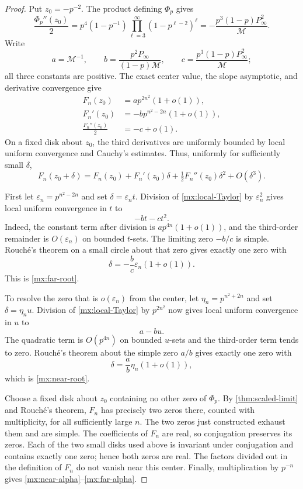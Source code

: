 \documentclass[11pt]{article}
\numberwithin{equation}{section}
\theoremstyle{definition}
\theoremstyle{remark}
\begin{document}
\begin{proof}
Put $z_0=-p^{-2}$.  The product defining $\Phi_p$ gives
\begin{equation}\label{mx:second-limit-derivative}
 \frac{\Phi_p''(z_0)}2
 =p^4(1-p^{-1})
 \prod_{\ell=3}^{\infty}(1-p^{\ell-2})^\ell
 =-\frac{p^3(1-p)P_\infty^2}{\mathcal M}.
\end{equation}
Write
\[
 a=\mathcal M^{-1},\qquad
 b=\frac{p^2P_\infty}{(1-p)\mathcal M},\qquad
 c=\frac{p^3(1-p)P_\infty^2}{\mathcal M};
\]
all three constants are positive.
The exact center value, the slope asymptotic, and derivative
convergence give
\begin{align*}
 F_n(z_0)&=a p^{2n^2}(1+o(1)),\\
 F_n'(z_0)&=-b p^{n^2-2n}(1+o(1)),\\
 \frac{F_n''(z_0)}2&=-c+o(1).
\end{align*}
On a fixed disk about $z_0$, the third derivatives are uniformly
bounded by local uniform convergence and Cauchy's estimates.
Thus, uniformly for sufficiently small $\delta$,
\begin{equation}\label{mx:local-Taylor}
 F_n(z_0+\delta)
 =F_n(z_0)+F_n'(z_0)\delta
 +\tfrac12F_n''(z_0)\delta^2+O(\delta^3).
\end{equation}

First let $\varepsilon_n=p^{n^2-2n}$ and set
$\delta=\varepsilon_nt$.
Division of \eqref{mx:local-Taylor} by $\varepsilon_n^2$ gives
local uniform convergence in $t$ to
\[
 -bt-ct^2.
\]
Indeed, the constant term after division is
$a p^{4n}(1+o(1))$, and the third-order remainder is
$O(\varepsilon_n)$ on bounded $t$-sets.
The limiting zero $-b/c$ is simple.
Rouch\'e's theorem on a small circle about that zero gives exactly
one zero with
\[
 \delta=-\frac bc\varepsilon_n(1+o(1)).
\]
This is \eqref{mx:far-root}.

To resolve the zero that is $o(\varepsilon_n)$ from the center,
let $\eta_n=p^{n^2+2n}$ and set $\delta=\eta_nu$.
Division of \eqref{mx:local-Taylor} by $p^{2n^2}$ now gives
local uniform convergence in $u$ to
\[
 a-bu.
\]
The quadratic term is $O(p^{4n})$ on bounded $u$-sets and the
third-order term tends to zero.
Rouch\'e's theorem about the simple zero $a/b$ gives exactly
one zero with
\[
 \delta=\frac ab\eta_n(1+o(1)),
\]
which is \eqref{mx:near-root}.

Choose a fixed disk about $z_0$ containing no other zero of
$\Phi_p$.  By \cref{thm:scaled-limit} and Rouch\'e's theorem,
$F_n$ has precisely two zeros there, counted with multiplicity,
for all sufficiently large $n$.
The two zeros just constructed exhaust them and are simple.
The coefficients of $F_n$ are real, so conjugation preserves its
zeros.  Each of the two small disks used above is invariant under
conjugation and contains exactly one zero; hence both zeros are real.
The factors divided out in the definition of $F_n$ do not vanish
near this center.  Finally, multiplication by $p^{-n}$ gives
\eqref{mx:near-alpha}--\eqref{mx:far-alpha}.
\end{proof}
\end{document}
